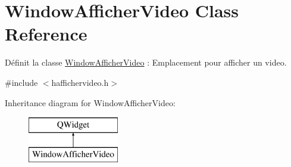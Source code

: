 \hypertarget{class_window_afficher_video}{}\section{Window\+Afficher\+Video Class Reference}
\label{class_window_afficher_video}


Définit la classe \hyperlink{class_window_afficher_video}{Window\+Afficher\+Video} \+: Emplacement pour afficher un video.  




{\ttfamily \#include $<$haffichervideo.\+h$>$}

Inheritance diagram for Window\+Afficher\+Video\+:\begin{figure}[H]
\begin{center}
\leavevmode
\includegraphics[height=2.000000cm]{class_window_afficher_video}
\end{center}
\end{figure}
